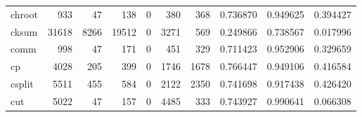 \begin{tabular}{lrrrrrrrrr}
chroot    &                                 933 &                                              47 &                                            138 &                                             0 &                                            380 &                                          368 &                                           0.736870 &                               0.949625 &                             0.394427 \\
cksum     &                               31618 &                                            8266 &                                          19512 &                                             0 &                                           3271 &                                          569 &                                           0.249866 &                               0.738567 &                             0.017996 \\
comm      &                                 998 &                                              47 &                                            171 &                                             0 &                                            451 &                                          329 &                                           0.711423 &                               0.952906 &                             0.329659 \\
cp        &                                4028 &                                             205 &                                            399 &                                             0 &                                           1746 &                                         1678 &                                           0.766447 &                               0.949106 &                             0.416584 \\
csplit    &                                5511 &                                             455 &                                            584 &                                             0 &                                           2122 &                                         2350 &                                           0.741698 &                               0.917438 &                             0.426420 \\
cut       &                                5022 &                                              47 &                                            157 &                                             0 &                                           4485 &                                          333 &                                           0.743927 &                               0.990641 &                             0.066308 \\

\end{tabular}
